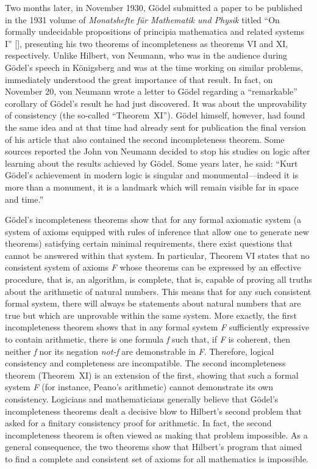 Two months later, in November 1930, G\"{o}del submitted a paper to be published in the 1931 volume of \textit{Monatshefte f\"{u}r Mathematik und Physik} titled ``On formally undecidable propositions of principia mathematica and related systems I'' [\citealt{chap:02:Godel:1931}], presenting his two theorems of incompleteness as theorems VI and XI, respectively. Unlike Hilbert, von Neumann, who was in the audience during G\"{o}del's speech in K\"{o}nigsberg and was at the time working on similar problems, immediately understood the great importance of that result. In fact, on November 20, von Neumann wrote a letter to G\"{o}del regarding a ``remarkable'' corollary of G\"{o}del's result he had just discovered. It was about the unprovability of consistency (the so-called ``Theorem~XI''). G\"{o}del himself, however, had found the same idea and at that time had already sent for publication the final version of his article that also contained the second incompleteness theorem. Some sources reported the John von Neumann decided to stop his studies on logic after learning about the results achieved by G\"{o}del. Some years later, he said: ``Kurt G\"{o}del's achievement in \hbox{modern} logic is singular and monumental---indeed it is more than a monument, it is a landmark which will remain visible far in space and time.''



G\"{o}del's incompleteness theorems show that for any formal axiomatic system (a system of axioms equipped with rules of inference that allow one to generate new theorems) satisfying certain minimal requirements, there exist questions that cannot be answered within that system. In particular, Theorem VI states that no consistent system of axioms \textit{F} whose theorems can be expressed by an effective procedure, that is, an algorithm, is complete, that is, capable of proving all truths about the arithmetic of natural numbers. This means that for any such consistent formal system, there will always be statements about natural numbers that are true but which are unprovable within the same system. More exactly, the first incompleteness theorem shows that in any formal system \textit{F} sufficiently expressive to contain arithmetic, there is one formula \textit{f} such that, if \textit{F} is coherent, then neither \textit{f} nor its negation \textit{not-f} are demonstrable in \textit{F}. Therefore, logical consistency and completeness are incompatible. The second incompleteness theorem (Theorem~XI) is an extension of the first, showing that such a formal system \textit{F} (for instance, Peano's arithmetic) cannot demonstrate its own consistency. Logicians and mathematicians generally believe that G\"{o}del's incompleteness theorems dealt a decisive blow to Hilbert's second problem that asked for a finitary consistency proof for arithmetic. In fact, the second incompleteness theorem is often viewed as making that problem impossible. As a general consequence, the two theorems show that Hilbert's program that aimed to find a complete and consistent set of axioms for all mathematics is impossible.

